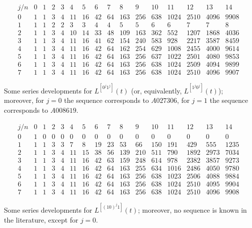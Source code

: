 \begin{table}
\begin{equation*}\begin{array}{c|ccccccccccccccc}j/n & 0 & 1 & 2 & 3 & 4 & 5 & 6 & 7 & 8 & 9 & 10 & 11 & 12 & 13 & 14\\\hline0 & 1 & 1 & 3 & 4 & 11 & 16 & 42 & 64 & 163 & 256 & 638 & 1024 & 2510 & 4096 & 9908\\1 & 1 & 1 & 2 & 2 & 3 & 3 & 4 & 4 & 5 & 5 & 6 & 6 & 7 & 7 & 8\\2 & 1 & 1 & 3 & 4 & 10 & 14 & 33 & 48 & 109 & 163 & 362 & 552 & 1207 & 1868 & 4036\\3 & 1 & 1 & 3 & 4 & 11 & 16 & 41 & 62 & 154 & 240 & 583 & 928 & 2217 & 3587 & 8459\\4 & 1 & 1 & 3 & 4 & 11 & 16 & 42 & 64 & 162 & 254 & 629 & 1008 & 2455 & 4000 & 9614\\5 & 1 & 1 & 3 & 4 & 11 & 16 & 42 & 64 & 163 & 256 & 637 & 1022 & 2501 & 4080 & 9853\\6 & 1 & 1 & 3 & 4 & 11 & 16 & 42 & 64 & 163 & 256 & 638 & 1024 & 2509 & 4094 & 9899\\7 & 1 & 1 & 3 & 4 & 11 & 16 & 42 & 64 & 163 & 256 & 638 & 1024 & 2510 & 4096 & 9907\end{array}\end{equation*}
\caption{Some series developments for $L^{[0^{j}1^j]}(t)$ (or, equivalently,
$L^{[1^{j}0^j]}(t)$); moreover, for $j=0$ the sequence corresponds to $A027306$,
for $j=1$ the sequence corresponds to $A008619$.}
\label{tbl:L0_j:1_j}
\end{table}

\begin{table}
\begin{equation*}\begin{array}{c|ccccccccccccccc}j/n & 0 & 1 & 2 & 3 & 4 & 5 & 6 & 7 & 8 & 9 & 10 & 11 & 12 & 13 & 14\\\hline0 & 1 & 0 & 0 & 0 & 0 & 0 & 0 & 0 & 0 & 0 & 0 & 0 & 0 & 0 & 0\\1 & 1 & 1 & 3 & 3 & 7 & 8 & 19 & 23 & 53 & 66 & 150 & 191 & 429 & 555 & 1235\\2 & 1 & 1 & 3 & 4 & 11 & 15 & 38 & 56 & 139 & 210 & 511 & 790 & 1892 & 2973 & 7034\\3 & 1 & 1 & 3 & 4 & 11 & 16 & 42 & 63 & 159 & 248 & 614 & 978 & 2382 & 3857 & 9273\\4 & 1 & 1 & 3 & 4 & 11 & 16 & 42 & 64 & 163 & 255 & 634 & 1016 & 2486 & 4050 & 9780\\5 & 1 & 1 & 3 & 4 & 11 & 16 & 42 & 64 & 163 & 256 & 638 & 1023 & 2506 & 4088 & 9884\\6 & 1 & 1 & 3 & 4 & 11 & 16 & 42 & 64 & 163 & 256 & 638 & 1024 & 2510 & 4095 & 9904\\7 & 1 & 1 & 3 & 4 & 11 & 16 & 42 & 64 & 163 & 256 & 638 & 1024 & 2510 & 4096 & 9908\end{array}\end{equation*}
\caption{Some series developments for $L^{[(10)^{j}1]}(t)$; moreover, no
sequence is known in the literature, except for $j=0$.}
\label{tbl:L10_j:1}
\end{table}

